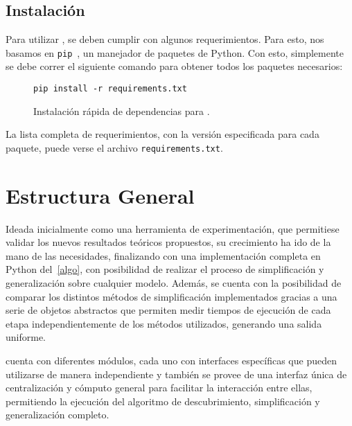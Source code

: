 
\subsection*{Instalación}
Para utilizar \pachtool, se deben cumplir con algunos requerimientos. Para esto, 
nos basamos en \texttt{pip}~\cite{pip}, un manejador de paquetes de Python. Con esto,
simplemente se debe correr el siguiente comando para obtener todos los
paquetes necesarios:

\begin{figure}[H]
    \centering
    \begin{Verbatim}[frame=single,fontsize=\scriptsize]
        pip install -r requirements.txt
    \end{Verbatim}
    \caption{Instalación rápida de dependencias para \pachtool.}
    \label{ej:pip_install}
\end{figure}

La lista completa de requerimientos, con la versión especificada para cada paquete,
puede verse el archivo \texttt{requirements.txt}.

\section{Estructura General}
\label{sec:4.general}

Ideada inicialmente como una herramienta de experimentación,
que permitiese validar los nuevos resultados teóricos propuestos, su crecimiento ha ido de la mano
de las necesidades, finalizando con una implementación completa en Python del~\autoref{algo},
con posibilidad de realizar el proceso de simplificación y generalización sobre cualquier modelo.
Además, se cuenta con la posibilidad de comparar los distintos métodos de simplificación
implementados gracias a una serie de objetos abstractos que permiten medir tiempos de 
ejecución de cada etapa independientemente de los métodos utilizados, 
generando una salida uniforme.

\pachtool cuenta con diferentes módulos, cada uno con interfaces específicas que pueden utilizarse de manera
independiente y también se provee de una interfaz única de centralización y cómputo general para 
facilitar la interacción entre ellas, permitiendo la ejecución del algoritmo 
de descubrimiento, simplificación y generalización completo.

